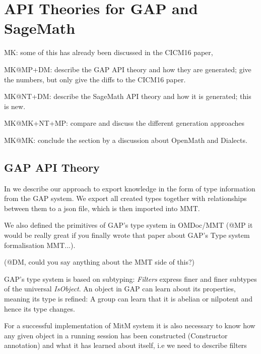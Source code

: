 \section{API Theories for GAP and SageMath}\label{sec:ift}
\begin{todolist}{MK: some of this has already been discussed in the CICM16 paper, }
\item MK@MP+DM: describe the GAP API theory and how they are generated; give the
numbers, but only give the diffs to the CICM16 paper.

\item MK@NT+DM: describe the SageMath API theory and how it is generated; this is
  new. 
\item MK@MK+NT+MP: compare and discuss the different generation approaches
\item MK@MK: conclude the section by a discussion about OpenMath and Dialects.
\end{todolist}


\subsection{GAP API Theory}

In \cite{DehKohKon:iop16} we describe our approach to export
knowledge in the form of type information from the GAP system. We export all
created types together with relationships between them to a json file, which is
then imported into MMT.

We also defined the primitives of GAP's type system in OMDoc/MMT (@MP it would
be really great if you finally wrote that paper about GAP's Type system formalisation MMT...).

(@DM, could you say anything about the MMT side of this?)

GAP's type system is based on subtyping: \emph{Filters} express finer and
finer subtypes of the universal \emph{IsObject}.
An object
in GAP can learn about its properties, meaning its type is refined: A group can
learn that it is abelian or
nilpotent and hence its type changes.

For a successful implementation of MitM system it is also necessary to
know how any given object in a running session has been constructed
(Constructor annotation) and what it has learned about itself, i.e we need to
describe filters


